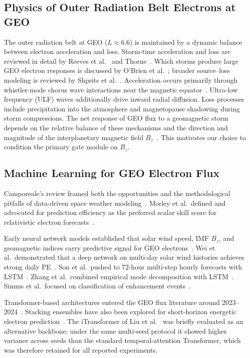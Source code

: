 \documentclass{ieeeaccess}
\begin{document}
\subsection{Physics of Outer Radiation Belt Electrons at GEO}
The outer radiation belt at GEO (\(L\approx6.6\)) is maintained by a dynamic
balance between electron acceleration and loss. Storm-time acceleration and loss
are reviewed in detail by Reeves et al.~\cite{b17} and Thorne~\cite{b18}. Which
storms produce large GEO electron responses is discussed by O'Brien et
al.~\cite{b19}; broader source--loss modeling is reviewed by Shprits et
al.~\cite{b20}. Acceleration occurs primarily through whistler-mode chorus wave
interactions near the magnetic equator~\cite{b2,b3,b6}. Ultra-low frequency (ULF)
waves additionally drive inward radial diffusion. Loss processes include
precipitation into the atmosphere and magnetopause shadowing during storm
compressions. The net response of GEO flux to a geomagnetic storm depends on the
relative balance of these mechanisms and the direction and magnitude of the
interplanetary magnetic field \(B_z\)~\cite{b2}. This motivates our choice to
condition the primary gate module on \(B_z\).

\subsection{Machine Learning for GEO Electron Flux}
Camporeale's review framed both the opportunities and the methodological pitfalls
of data-driven space weather modeling~\cite{b21}. Morley et al.\ defined and
advocated for prediction efficiency as the preferred scalar skill score for
relativistic electron forecasts~\cite{b22}.

Early neural network models established that solar wind speed, IMF \(B_z\), and
geomagnetic indices carry predictive signal for GEO electrons~\cite{b7}. Wei et
al.\ demonstrated that a deep network on multi-day solar wind histories achieves
strong daily PE~\cite{b8}. Son et al.\ pushed to 72-hour multi-step hourly
forecasts with LSTM~\cite{b9}. Zhang et al.\ combined empirical mode decomposition
with LSTM~\cite{b10}. Simms et al.\ focused on classification of enhancement
events~\cite{b11}.

Transformer-based architectures entered the GEO flux literature around
2023--2024~\cite{b14,b15,b16}. Stacking ensembles have also been explored for
short-horizon energetic electron prediction~\cite{b23}. The iTransformer of Liu
et al.~\cite{b24} was briefly evaluated as an alternative backbone; under the same
multi-seed protocol it showed higher variance across seeds than the standard
temporal-attention Transformer, which was therefore retained for all reported
experiments.
\end{document}
